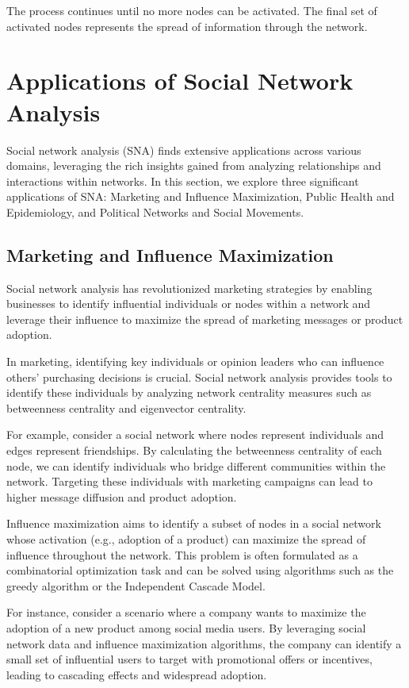 \documentclass[12pt]{book} %
\begin{document}
The process continues until no more nodes can be activated. The final set of activated nodes represents the spread of information through the network.


\section{Applications of Social Network Analysis}

Social network analysis (SNA) finds extensive applications across various domains, leveraging the rich insights gained from analyzing relationships and interactions within networks. In this section, we explore three significant applications of SNA: Marketing and Influence Maximization, Public Health and Epidemiology, and Political Networks and Social Movements.

\subsection{Marketing and Influence Maximization}

Social network analysis has revolutionized marketing strategies by enabling businesses to identify influential individuals or nodes within a network and leverage their influence to maximize the spread of marketing messages or product adoption.

In marketing, identifying key individuals or opinion leaders who can influence others' purchasing decisions is crucial. Social network analysis provides tools to identify these individuals by analyzing network centrality measures such as betweenness centrality and eigenvector centrality. 

For example, consider a social network where nodes represent individuals and edges represent friendships. By calculating the betweenness centrality of each node, we can identify individuals who bridge different communities within the network. Targeting these individuals with marketing campaigns can lead to higher message diffusion and product adoption.

Influence maximization aims to identify a subset of nodes in a social network whose activation (e.g., adoption of a product) can maximize the spread of influence throughout the network. This problem is often formulated as a combinatorial optimization task and can be solved using algorithms such as the greedy algorithm or the Independent Cascade Model.

For instance, consider a scenario where a company wants to maximize the adoption of a new product among social media users. By leveraging social network data and influence maximization algorithms, the company can identify a small set of influential users to target with promotional offers or incentives, leading to cascading effects and widespread adoption.
\end{document}

